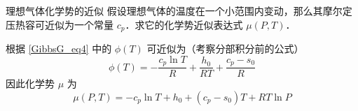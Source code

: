 \begin{example}{理想气体化学势的近似}
假设理想气体的温度在一个小范围内变动，那么其摩尔定压热容可近似为一个常量 $c_p$．求它的化学势近似表达式 $\mu(P,T)$．

根据 \autoref{GibbsG_eq4} 中的 $\phi(T)$ 可近似为（考察分部积分前的公式）
\begin{equation}
\phi(T)=-\frac{c_p\ln T}{R}+\frac{h_0}{RT}+\frac{c_p-s_0}{R}
\end{equation}
因此化学势 $\mu$ 为
\begin{equation}\label{GibbsG_eq5}
\mu(P,T)=-c_p\ln T+h_0+(c_p-s_0)T+RT\ln P
\end{equation}

\end{example}
